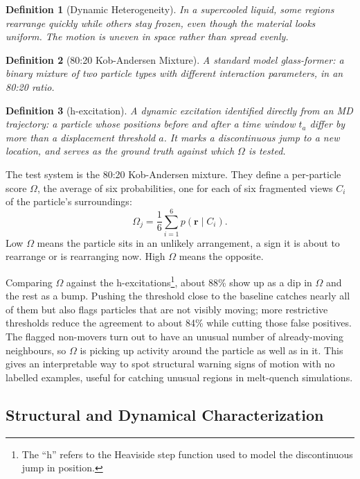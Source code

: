 \documentclass{article}
\newtheorem{definition}{Definition}
\begin{document}
\begin{definition}[Dynamic Heterogeneity]
    In a supercooled liquid, some regions rearrange quickly while others stay frozen, even though the material looks uniform. The motion is uneven in space rather than spread evenly.
\end{definition}
\begin{definition}[80:20 Kob-Andersen Mixture]
    A standard model glass-former: a binary mixture of two particle types with different interaction parameters, in an 80:20 ratio.
\end{definition}
\begin{definition}[h-excitation]
    A dynamic excitation identified directly from an MD trajectory: a particle whose positions before and after a time window $t_a$ differ by more than a displacement threshold $a$. It marks a discontinuous jump to a new location, and serves as the ground truth against which $\Omega$ is tested.
\end{definition}

The test system is the 80:20 Kob-Andersen mixture. They define a per-particle score $\Omega$, the average of six probabilities, one for each of six fragmented views $C_i$ of the particle's surroundings:
\begin{equation}
    \Omega_j = \frac{1}{6}\sum_{i=1}^{6} p(\mathbf{r} \mid C_i).
\end{equation}
Low $\Omega$ means the particle sits in an unlikely arrangement, a sign it is about to rearrange or is rearranging now. High $\Omega$ means the opposite.

Comparing $\Omega$ against the h-excitations\footnote{The ``h'' refers to the Heaviside step function used to model the discontinuous jump in position.}, about 88\% show up as a dip in $\Omega$ and the rest as a bump. Pushing the threshold close to the baseline catches nearly all of them but also flags particles that are not visibly moving; more restrictive thresholds reduce the agreement to about 84\% while cutting those false positives. The flagged non-movers turn out to have an unusual number of already-moving neighbours, so $\Omega$ is picking up activity around the particle as well as in it. This gives an interpretable way to spot structural warning signs of motion with no labelled examples, useful for catching unusual regions in melt-quench simulations.

\subsection{Structural and Dynamical Characterization}
\label{sec:metrics}
\end{document}
